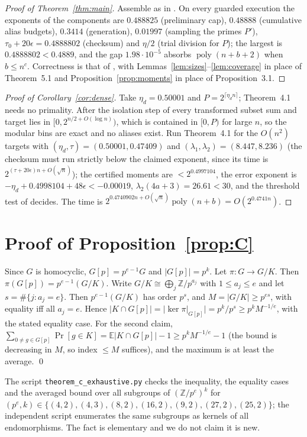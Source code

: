 \documentclass[11pt]{amsart}
\theoremstyle{remark}
\newcommand{\E}{\mathbb E}
\newcommand{\Z}{\mathbb Z}
\newcommand{\eps}{\epsilon}
\begin{document}
\begin{proof}[Proof of Theorem~\ref{thm:main}]
Assemble as in \cite[Section~6]{oai}. On every guarded execution the exponents of the components are
$0.488825$ (preliminary cap), $0.48888$ (cumulative alias budgets), $0.3414$ (generation),
$0.01997$ (sampling the primes $P'$),
$\tau_0+20\eps=0.4888802$ (checksum) and $\eta/2$ (trial division for $P$); the largest is
$0.4888802<0.4889$, and the gap $1.98\cdot10^{-5}$ absorbs $\operatorname{poly}(n+b+2)$ when $b\le n^c$.
Correctness is that of \cite{oai}, with Lemmas~\ref{lem:sizes}--\ref{lem:coverage} in place of
Theorem~5.1 and Proposition~\ref{prop:moments} in place of Proposition~3.1.
\end{proof}

\begin{proof}[Proof of Corollary~\ref{cor:dense}]
Take $\eta_d=0.50001$ and $P=2^{\lceil\eta_dn\rceil}$; Theorem~4.1 needs no primality. After the
isolation step of \cite[Lemma~2.1]{oai} every transformed subset sum and target lies in
$[0,2^{n/2+O(\log n)})$, which is contained in $[0,P)$ for large $n$, so the modular bins are exact and no aliases exist. Run
Theorem~4.1 for the $O(n^2)$ targets with $(\eta_d,\tau)=(0.50001,0.47409)$ and
$(\lambda_1,\lambda_2)=(8.447,8.236)$ (the checksum must run strictly below the claimed exponent,
since its time is $2^{(\tau+20\eps)n+O(\sqrt n)}$); the certified moments are $<2^{0.4997104}$, the error
exponent is $-\eta_d+0.4998104+48\eps<-0.00019$, $\lambda_2(4a+3)=26.61<30$, and the threshold test of
\cite[Section~6]{oai} decides. The time is $2^{0.4740902n+O(\sqrt n)}\operatorname{poly}(n+b)=O(2^{0.4741n})$.
\end{proof}

\section{Proof of Proposition~\ref{prop:C}}
Since $G$ is homocyclic, $G[p]=p^{e-1}G$ and $|G[p]|=p^k$. Let $\pi:G\to G/K$. Then
$\pi(G[p])=p^{e-1}(G/K)$. Write $G/K\cong\bigoplus_j\Z/p^{a_j}$ with $1\le a_j\le e$ and let
$s=\#\{j:a_j=e\}$. Then $p^{e-1}(G/K)$ has order $p^s$, and $M=|G/K|\ge p^{es}$, with equality iff all
$a_j=e$. Hence $|K\cap G[p]|=|\ker\pi|_{G[p]}|=p^k/p^s\ge p^kM^{-1/e}$, with the stated equality case.
For the second claim, $\sum_{0\ne g\in G[p]}\Pr[g\in K]=\E|K\cap G[p]|-1\ge p^kM^{-1/e}-1$ (the bound is
decreasing in $M$, so index $\le M$ suffices), and the maximum is at least the average. \qed

The script \texttt{theorem\_c\_exhaustive.py} checks the inequality, the equality cases and the
averaged bound over all subgroups of $(\Z/p^e)^k$ for $(p^e,k)\in\{(4,2),(4,3),(8,2),(16,2),(9,2),(27,2),(25,2)\}$;
the independent script enumerates the same subgroups as kernels of all endomorphisms.
The fact is elementary and we do not claim it is new.
\end{document}
